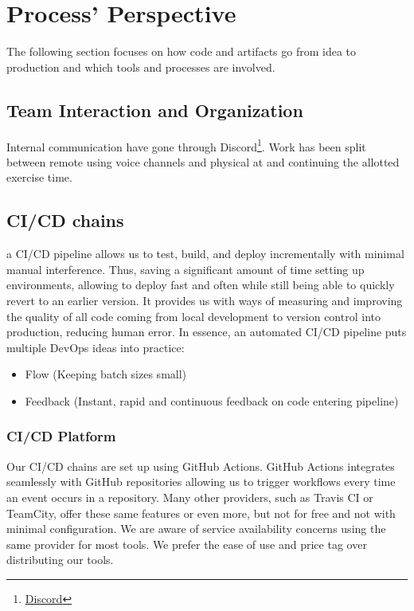 \section{Process' Perspective}
\label{sec:processPerspective}
The following section focuses on how code and artifacts go from idea to production and which tools and processes are involved.
\subsection{Team Interaction and Organization}
\label{subsec:TeamInteraction}
Internal communication have gone through Discord\footnote{\href{https://discord.com/}{Discord}}. Work has been split between remote using voice channels and physical at and continuing the allotted exercise time.
\subsection{CI/CD chains}
\label{subsec:cicd}
a CI/CD pipeline allows us to test, build, and deploy \mini incrementally with minimal manual interference. Thus, saving a significant amount of time setting up environments, allowing to deploy fast and often while still being able to quickly revert to an earlier version.
It provides us with ways of measuring and improving the quality of all code coming from local development to version control into production, reducing human error.\cite{Chen2015}
In essence, an automated CI/CD pipeline puts multiple DevOps ideas into practice: 
\begin{itemize}
    \item Flow (Keeping batch sizes small)\cite{Kim2016}
    \item Feedback (Instant, rapid and continuous feedback on code entering pipeline)\cite{Kim2016}
\end{itemize}


\subsubsection{CI/CD Platform}
\label{subsubsec:cicdPlatform}
Our CI/CD chains are set up using GitHub Actions. GitHub Actions integrates seamlessly with GitHub repositories allowing us to trigger workflows every time an event occurs in a repository\cite{githubActions}. Many other providers, such as Travis CI or TeamCity, offer these same features or even more, but not for free and not with minimal configuration. We are aware of service availability concerns using the same provider for most tools. We prefer the ease of use and price tag over distributing our tools.

